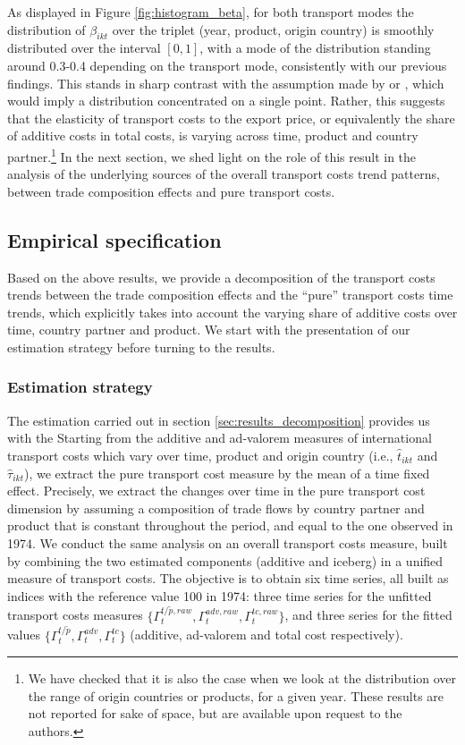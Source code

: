 \documentclass[a4paper,11pt]{article}
\begin{document}
As displayed in Figure \ref{fig:histogram_beta}, for both transport modes the distribution of $\beta_{ikt}$ over the triplet (year, product, origin country) is smoothly distributed over the interval $[0,1]$, with a mode of the distribution standing around 0.3-0.4 depending on the transport mode, consistently with our previous findings.
This stands in sharp contrast with the assumption made by  \cite{hummels_skiba} or \cite{hummels2007}, which would imply a distribution concentrated on a single point.
Rather, this suggests that the elasticity of transport costs to the export price, or equivalently the share of additive costs in total costs, is varying across time, product and country partner.\footnote{We have checked that it is also the case when we look at the distribution over the range of origin countries or products, for a given year.
These results are not reported for sake of space, but are available upon request to the authors.} In the next section, we shed light on the role of this result in the analysis of the underlying sources of the overall transport costs trend patterns, between trade composition effects and pure transport costs.

\subsection{Empirical specification}

Based on the above results, we provide a decomposition of the transport costs trends between the trade composition effects and the ``pure'' transport costs time trends, which explicitly takes into account the varying share of additive costs over time, country partner and product. We start with the presentation of our estimation strategy before turning to the results.

\subsubsection{Estimation strategy}

The estimation carried out in section \ref{sec:results_decomposition} provides us with the
Starting from the additive and ad-valorem measures of international transport costs which vary over time, product and origin country (i.e., $\widehat{t}_{ikt}$ and $\widehat{\tau}_{ikt}$), we extract the pure transport cost measure by the mean of a time fixed effect.
Precisely, we extract the changes over time in the pure transport cost dimension by assuming a composition of trade flows by country partner and product that is constant throughout the period, and equal to the one observed in 1974. We conduct the same analysis on an overall transport costs measure, built by combining the two estimated components (additive and iceberg) in a unified measure of transport costs. The objective is to obtain six time series, all built as indices with the reference value 100 in 1974: three time series for the unfitted transport costs measures $\{\Gamma^{t/\widetilde{p}, raw}_t, \Gamma^{adv, raw}_t, \Gamma^{tc, raw}_t \}$, and three series for the fitted values $\{\Gamma^{t/\widetilde{p}}_t, \Gamma^{adv}_t, \Gamma^{tc}_t \}$ (additive, ad-valorem and total cost respectively).
\end{document}
